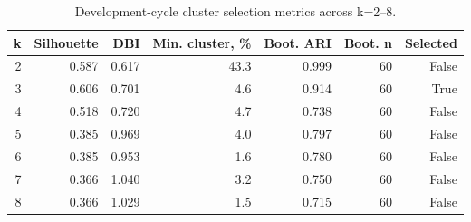 \begin{table}[H]
\centering
\caption{Development-cycle cluster selection metrics across k=2--8.}
\label{tab:cluster_selection}
\scriptsize
\setlength{\tabcolsep}{3pt}
\begin{tabular*}{\textwidth}{@{\extracolsep{\fill}}rrrrrrr@{}}
\toprule
k & Silhouette & DBI & Min. cluster, \% & Boot. ARI & Boot. n & Selected \\
\midrule
2 & 0.587 & 0.617 & 43.3 & 0.999 & 60 & False \\
3 & 0.606 & 0.701 & 4.6 & 0.914 & 60 & True \\
4 & 0.518 & 0.720 & 4.7 & 0.738 & 60 & False \\
5 & 0.385 & 0.969 & 4.0 & 0.797 & 60 & False \\
6 & 0.385 & 0.953 & 1.6 & 0.780 & 60 & False \\
7 & 0.366 & 1.040 & 3.2 & 0.750 & 60 & False \\
8 & 0.366 & 1.029 & 1.5 & 0.715 & 60 & False \\
\bottomrule
\end{tabular*}
\end{table}

